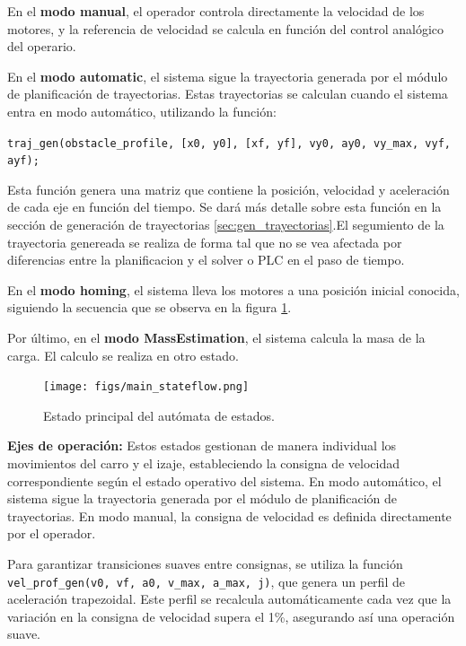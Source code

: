 \documentclass{article}
\begin{document}
            En el \textbf{modo manual}, el operador controla directamente la velocidad de los motores, y la referencia de velocidad se calcula en función del control analógico del operario.

            En el \textbf{modo automatic}, el sistema sigue la trayectoria generada por el módulo de planificación de trayectorias. Estas trayectorias se calculan cuando el sistema entra en modo automático, utilizando la función:
            \begin{center}
            \texttt{traj\_gen(obstacle\_profile, [x0, y0], [xf, yf], vy0, ay0, vy\_max, vyf, ayf);}
            \end{center}
            Esta función genera una matriz que contiene la posición, velocidad y aceleración de cada eje en función del tiempo. Se dará más detalle sobre esta función en la sección de generación de trayectorias \ref{sec:gen_trayectorias}.El segumiento de la trayectoria genereada se realiza de forma tal que no se vea afectada por diferencias entre la planificacion y el solver o PLC en el paso de tiempo. 

            En el \textbf{modo homing}, el sistema lleva los motores a una posición inicial conocida, siguiendo la secuencia que se observa en la figura \ref{fig:main_stateflow}.

            Por último, en el \textbf{modo MassEstimation}, el sistema calcula la masa de la carga. El calculo se realiza en otro estado.

        
            \begin{figure} [H]
                \centering
                \texttt{[image: figs/main\_stateflow.png]}
                \caption{Estado principal del autómata de estados.}
                \label{fig:main_stateflow}
            \end{figure}

        \textbf{Ejes de operación:}
            Estos estados gestionan de manera individual los movimientos del carro y el izaje, estableciendo la consigna de velocidad correspondiente según el estado operativo del sistema. En modo automático, el sistema sigue la trayectoria generada por el módulo de planificación de trayectorias. En modo manual, la consigna de velocidad es definida directamente por el operador.

            Para garantizar transiciones suaves entre consignas, se utiliza la función \texttt{vel\_prof\_gen(v0, vf, a0, v\_max, a\_max, j)}, que genera un perfil de aceleración trapezoidal. Este perfil se recalcula automáticamente cada vez que la variación en la consigna de velocidad supera el 1\%, asegurando así una operación suave.
\end{document}
